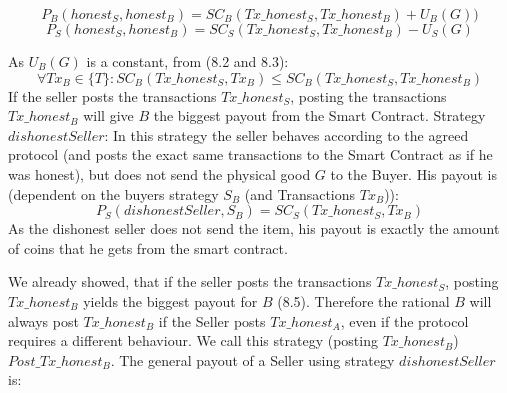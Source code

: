 \documentclass{cacthesis}
\begin{document}
\begin{equation}
    P_B(honest_S,honest_B) = SC_B(Tx\_honest_S, Tx\_honest_B) + U_B(G))
\end{equation} 
\begin{equation}
    P_S(honest_S,honest_B) = SC_S(Tx\_honest_S, Tx\_honest_B) - U_S(G) 
\end{equation}

As $U_B(G)$ is a constant, from (8.2 and 8.3):
\begin{equation}
    \forall Tx_B \in \{T\}: SC_B(Tx\_honest_S, Tx_B) \leq SC_B(Tx\_honest_S, Tx\_honest_B)
\end{equation}
If the seller posts the transactions $Tx\_honest_S$, posting the transactions $Tx\_honest_B$ will give $B$ the biggest payout from the Smart Contract.
Strategy $dishonestSeller$: In this strategy the seller behaves according to the agreed protocol (and posts the exact same transactions to the Smart Contract as if he was honest), but does not send the physical good $G$ to the Buyer.\newline
His payout is (dependent on the buyers strategy $S_B$ (and Transactions $Tx_B$)):
\begin{equation}
    P_S(dishonestSeller,S_B) = SC_S(Tx\_honest_S,Tx_B)
\end{equation}
As the dishonest seller does not send the item, his payout is exactly the amount of coins that he gets from the smart contract.\newline

We already showed, that if the seller posts the transactions $Tx\_honest_S$, posting $Tx\_honest_B$ yields the biggest payout for $B$ (8.5).\newline
Therefore the rational $B$ will always post $Tx\_honest_B$ if the Seller posts $Tx\_honest_A$, even if the protocol requires a different behaviour. We call this strategy (posting $Tx\_honest_B$) $Post\_Tx\_honest_B$.\newline
The general payout of a Seller using strategy $dishonestSeller$ is:
\end{document}
